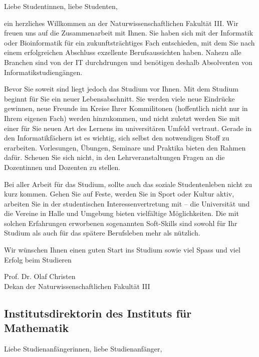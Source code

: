 Liebe Studentinnen, liebe Studenten,

ein herzliches Willkommen an der Naturwissenschaftlichen Fakultät III.
Wir freuen uns auf die Zusammenarbeit mit Ihnen.
Sie haben sich mit der Informatik oder Bioinformatik für ein zukunftsträchtiges Fach entschieden, mit dem Sie nach einem erfolgreichen Abschluss exzellente Berufsaussichten haben.
Nahezu alle Branchen sind von der IT durchdrungen und benötigen deshalb Absolventen von Informatikstudiengängen.

Bevor Sie soweit sind liegt jedoch das Studium vor Ihnen.
Mit dem Studium beginnt für Sie ein neuer Lebensabschnitt.
Sie werden viele neue Eindrücke gewinnen, neue Freunde im Kreise Ihrer Kommilitonen (hoffentlich nicht nur in Ihrem eigenen Fach) werden hinzukommen, und nicht zuletzt werden Sie mit einer für Sie neuen Art des Lernens im universitären Umfeld vertraut.
Gerade in den Informatikfächern ist es wichtig, sich selbst den notwendigen Stoff zu erarbeiten.
Vorlesungen, Übungen, Seminare und Praktika bieten den Rahmen dafür.
Scheuen Sie sich nicht, in den Lehrveranstaltungen Fragen an die Dozentinnen und Dozenten zu stellen. 

Bei aller Arbeit für das Studium, sollte auch das soziale Studentenleben nicht zu kurz kommen. Gehen Sie auf Feste, werden Sie in Sport oder Kultur aktiv, arbeiten Sie in der studentischen Interessenvertretung mit -- die Universität und die Vereine in Halle und Umgebung bieten vielfältige Möglichkeiten.
Die mit solchen Erfahrungen erworbenen sogenannten Soft-Skills sind sowohl für Ihr Studium als auch für das spätere Berufsleben mehr als nützlich.

Wir wünschen Ihnen einen guten Start ins Studium sowie viel Spass und viel Erfolg beim Studieren

Prof. Dr. Olaf Christen\\
Dekan der Naturwissenschaftlichen Fakultät III 

\newpage

 \subsection{Institutsdirektorin des Instituts für Mathematik}
 
 Liebe Studienanfängerinnen, liebe Studienanfänger,
 
